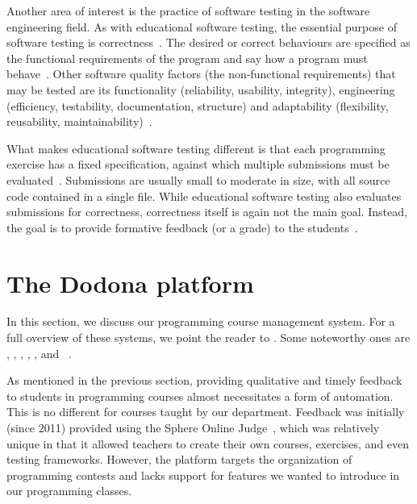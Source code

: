 \documentclass[../main]{subfiles}
\begin{document}
Another area of interest is the practice of software testing in the software engineering field.
As with educational software testing, the essential purpose of software testing is correctness~\autocite{panSoftwareTesting1999}.
The desired or correct behaviours are specified as the functional requirements of the program and say how a program must behave~\autocite{bassSoftwareArchitecturePractice2021}.
Other software quality factors (the non‐functional requirements) that may be tested are its functionality (reliability, usability, integrity), engineering (efficiency, testability, documentation, structure) and adaptability (flexibility, reusability, maintainability)~\autocite{hetzelCompleteGuideSoftware1988}.

What makes educational software testing different is that each programming exercise has a fixed specification, against which multiple submissions must be evaluated~\autocite{wilcoxTestingStrategiesAutomated2016}.
Submissions are usually small to moderate in size, with all source code contained in a single file.
While educational software testing also evaluates submissions for correctness, correctness itself is again not the main goal.
Instead, the goal is to provide formative feedback (or a grade) to the students~\autocite{caizaProgrammingAssignmentsAutomatic2013}.

\section{The Dodona platform}\label{sec:dodona}

In this section, we discuss our programming course management system.
For a full overview of these systems, we point the reader to \textcite{messerAutomatedGradingFeedback2024}.
Some noteworthy ones are , , , , , and ~\autocite{kosowskiApplicationOnlineJudge2008,enstromFiveYearsKattis2011,petitJutgeOrgCharacteristics2018,lealMooshakWebBased2003,kruscheArTEMiSAutomaticAssessment2018,revillaCompetitiveLearningInformatics2008}.

As mentioned in the previous section, providing qualitative and timely feedback to students in programming courses almost necessitates a form of automation.
This is no different for courses taught by our department.
Feedback was initially (since 2011) provided using the Sphere Online Judge~\autocite{kosowskiApplicationOnlineJudge2008}, which was relatively unique in that it allowed teachers to create their own courses, exercises, and even testing frameworks.
However, the platform targets the organization of programming contests and lacks support for features we wanted to introduce in our programming classes.
\end{document}
